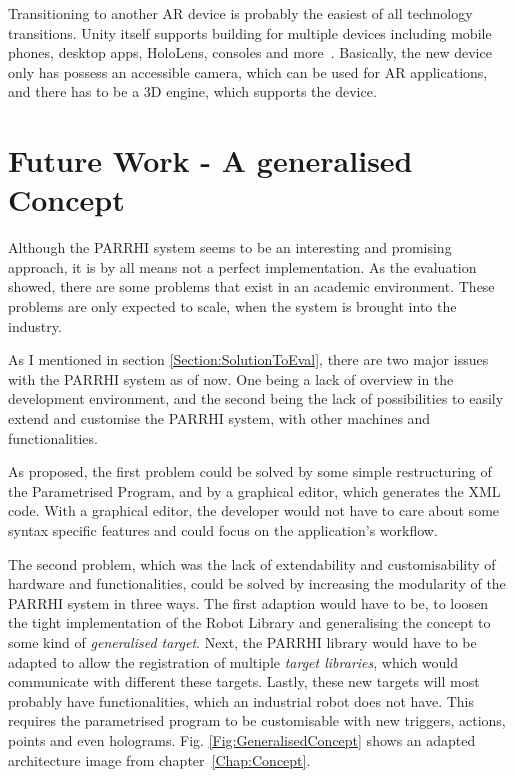 Transitioning to another AR device is probably the easiest of all technology transitions. Unity itself supports building for multiple devices including mobile phones, desktop apps, HoloLens, consoles and more~\cite{UnityPlatforms}. Basically, the new device only has possess an accessible camera, which can be used for AR applications, and there has to be a 3D engine, which supports the device. 

\section{Future Work - A generalised Concept}\label{Section:FutureWork}

Although the PARRHI system seems to be an interesting and promising approach, it is by all means not a perfect implementation. As the evaluation showed, there are some problems that exist in an academic environment. These problems are only expected to scale, when the system is brought into the industry. 

As I mentioned in section \ref{Section:SolutionToEval}, there are two major issues with the PARRHI system as of now. One being a lack of overview in the development environment, and the second being the lack of possibilities to easily extend and customise the PARRHI system, with other machines and functionalities.

As proposed, the first problem could be solved by some simple restructuring of the Parametrised Program, and by a graphical editor, which generates the XML code. With a graphical editor, the developer would not have to care about some syntax specific features and could focus on the application's workflow. 

The second problem, which was the lack of extendability and customisability of hardware and functionalities, could be solved by increasing the modularity of the PARRHI system in three ways. The first adaption would have to be, to loosen the tight implementation of the Robot Library and generalising the concept to some kind of \textit{generalised target}. Next, the PARRHI library would have to be adapted to allow the registration of multiple \textit{target libraries}, which would communicate with different these targets. Lastly, these new targets will most probably have functionalities, which an industrial robot does not have. This requires the parametrised program to be customisable with new triggers, actions, points and even holograms. Fig. \ref{Fig:GeneralisedConcept} shows an adapted architecture image from chapter~\ref{Chap:Concept}.

